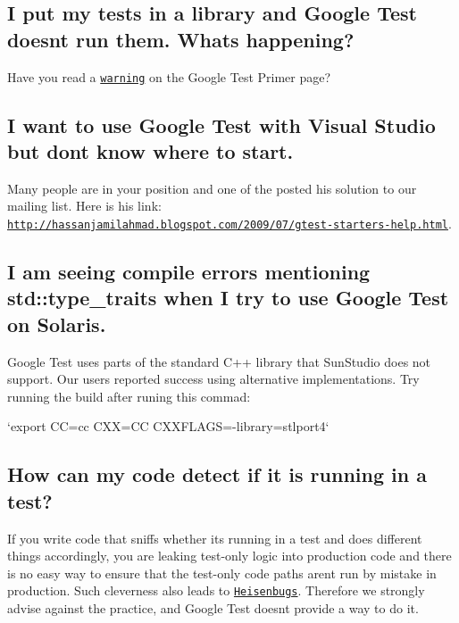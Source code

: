 \subsection*{I put my tests in a library and Google Test doesn\textquotesingle{}t run them. What\textquotesingle{}s happening?}

Have you read a \href{V1_6_Primer.md#important-note-for-visual-c-users}{\tt warning} on the Google Test Primer page?

\subsection*{I want to use Google Test with Visual Studio but don\textquotesingle{}t know where to start.}

Many people are in your position and one of the posted his solution to our mailing list. Here is his link\+: \href{http://hassanjamilahmad.blogspot.com/2009/07/gtest-starters-help.html}{\tt http\+://hassanjamilahmad.\+blogspot.\+com/2009/07/gtest-\/starters-\/help.\+html}.

\subsection*{I am seeing compile errors mentioning std\+::type\+\_\+traits when I try to use Google Test on Solaris.}

Google Test uses parts of the standard C++ library that Sun\+Studio does not support. Our users reported success using alternative implementations. Try running the build after runing this commad\+:

`export CC=cc C\+XX=CC C\+X\+X\+F\+L\+A\+GS=\textquotesingle{}-\/library=stlport4\textquotesingle{}`

\subsection*{How can my code detect if it is running in a test?}

If you write code that sniffs whether it\textquotesingle{}s running in a test and does different things accordingly, you are leaking test-\/only logic into production code and there is no easy way to ensure that the test-\/only code paths aren\textquotesingle{}t run by mistake in production. Such cleverness also leads to \href{http://en.wikipedia.org/wiki/Unusual_software_bug#Heisenbug}{\tt Heisenbugs}. Therefore we strongly advise against the practice, and Google Test doesn\textquotesingle{}t provide a way to do it.

